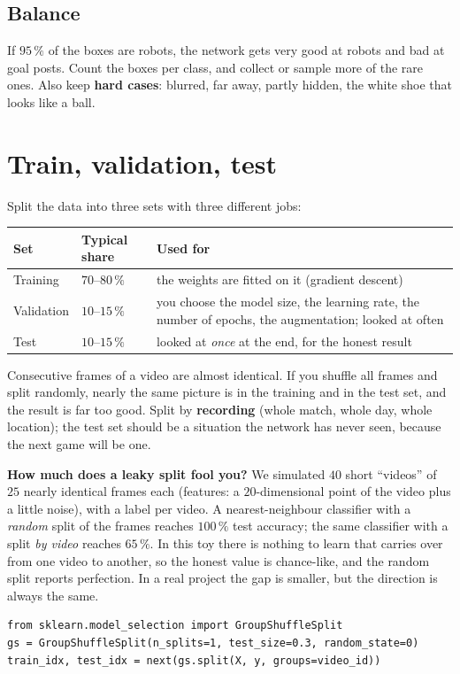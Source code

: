 \subsection*{Balance}
If $95\,\%$ of the boxes are robots, the network gets very good at robots and bad at goal posts. Count the boxes per class, and collect or sample more of the rare ones. Also keep \textbf{hard cases}: blurred, far away, partly hidden, the white shoe that looks like a ball.

\section*{Train, validation, test}
Split the data into three sets with three different jobs:
\begin{center}
\renewcommand{\arraystretch}{1.25}
\begin{tabular}{p{2.6cm}p{3.0cm}p{6.8cm}}
\textbf{Set} & \textbf{Typical share} & \textbf{Used for}\\ \hline
Training & $70$--$80\,\%$ & the weights are fitted on it (gradient descent)\\
Validation & $10$--$15\,\%$ & you choose the model size, the learning rate, the number of epochs, the augmentation; looked at often\\
Test & $10$--$15\,\%$ & looked at \emph{once} at the end, for the honest result\\
\end{tabular}
\end{center}
\begin{keyidea}
Consecutive frames of a video are almost identical. If you shuffle all frames and split randomly, nearly the same picture is in the training and in the test set, and the result is far too good. Split by \textbf{recording} (whole match, whole day, whole location); the test set should be a situation the network has never seen, because the next game will be one.
\end{keyidea}
\begin{example}
\textbf{How much does a leaky split fool you?} We simulated $40$ short ``videos'' of $25$ nearly identical frames each (features: a $20$-dimensional point of the video plus a little noise), with a label per video. A nearest-neighbour classifier with a \emph{random} split of the frames reaches $100\,\%$ test accuracy; the same classifier with a split \emph{by video} reaches $65\,\%$. In this toy there is nothing to learn that carries over from one video to another, so the honest value is chance-like, and the random split reports perfection. In a real project the gap is smaller, but the direction is always the same.
\end{example}
\begin{verbatim}
from sklearn.model_selection import GroupShuffleSplit
gs = GroupShuffleSplit(n_splits=1, test_size=0.3, random_state=0)
train_idx, test_idx = next(gs.split(X, y, groups=video_id))
\end{verbatim}

